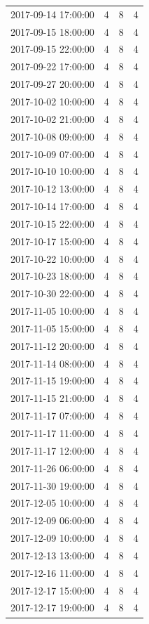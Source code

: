 \begin{tabular}{lrrr}
2017-09-14 17:00:00 & 4 & 8 & 4 \\
2017-09-15 18:00:00 & 4 & 8 & 4 \\
2017-09-15 22:00:00 & 4 & 8 & 4 \\
2017-09-22 17:00:00 & 4 & 8 & 4 \\
2017-09-27 20:00:00 & 4 & 8 & 4 \\
2017-10-02 10:00:00 & 4 & 8 & 4 \\
2017-10-02 21:00:00 & 4 & 8 & 4 \\
2017-10-08 09:00:00 & 4 & 8 & 4 \\
2017-10-09 07:00:00 & 4 & 8 & 4 \\
2017-10-10 10:00:00 & 4 & 8 & 4 \\
2017-10-12 13:00:00 & 4 & 8 & 4 \\
2017-10-14 17:00:00 & 4 & 8 & 4 \\
2017-10-15 22:00:00 & 4 & 8 & 4 \\
2017-10-17 15:00:00 & 4 & 8 & 4 \\
2017-10-22 10:00:00 & 4 & 8 & 4 \\
2017-10-23 18:00:00 & 4 & 8 & 4 \\
2017-10-30 22:00:00 & 4 & 8 & 4 \\
2017-11-05 10:00:00 & 4 & 8 & 4 \\
2017-11-05 15:00:00 & 4 & 8 & 4 \\
2017-11-12 20:00:00 & 4 & 8 & 4 \\
2017-11-14 08:00:00 & 4 & 8 & 4 \\
2017-11-15 19:00:00 & 4 & 8 & 4 \\
2017-11-15 21:00:00 & 4 & 8 & 4 \\
2017-11-17 07:00:00 & 4 & 8 & 4 \\
2017-11-17 11:00:00 & 4 & 8 & 4 \\
2017-11-17 12:00:00 & 4 & 8 & 4 \\
2017-11-26 06:00:00 & 4 & 8 & 4 \\
2017-11-30 19:00:00 & 4 & 8 & 4 \\
2017-12-05 10:00:00 & 4 & 8 & 4 \\
2017-12-09 06:00:00 & 4 & 8 & 4 \\
2017-12-09 10:00:00 & 4 & 8 & 4 \\
2017-12-13 13:00:00 & 4 & 8 & 4 \\
2017-12-16 11:00:00 & 4 & 8 & 4 \\
2017-12-17 15:00:00 & 4 & 8 & 4 \\
2017-12-17 19:00:00 & 4 & 8 & 4 \\

\end{tabular}
